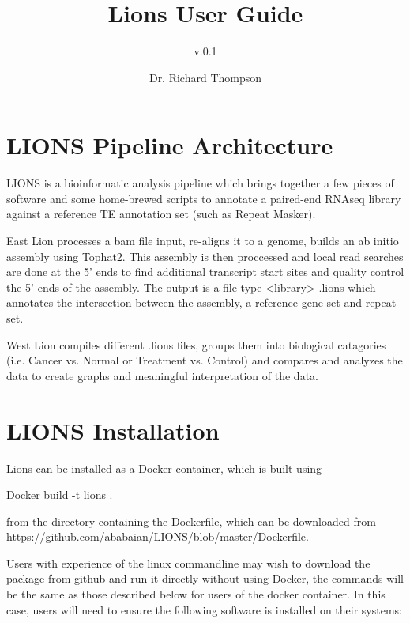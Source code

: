 \documentclass[11pt]{scrartcl}
\title{Lions User Guide}
\subtitle{v.0.1}
\author{Dr. Richard Thompson}
\newcommand{\arrows}[1]{\textless #1\textgreater}
\begin{document}
\maketitle

\tableofcontents


\section{LIONS Pipeline Architecture}
LIONS is a bioinformatic analysis pipeline which brings together a
 few pieces of software and some home-brewed scripts to annotate a
 paired-end RNAseq library against a reference TE annotation set
 (such as Repeat Masker).

 East Lion processes a bam file input, re-aligns it to a genome,
 builds an ab initio assembly using Tophat2. This assembly is then
 proccessed and local read searches are done at the 5' ends to find
 additional transcript start sites and quality control the 5' ends of
 the assembly. The output is a file-type \arrows{library} .lions which
 annotates the intersection between the assembly, a reference gene set
 and repeat set.

 West Lion compiles different .lions files, groups them into biological
 catagories (i.e. Cancer vs. Normal or Treatment vs. Control) and
 compares and analyzes the data to create graphs and meaningful
 interpretation of the data.

\section{LIONS Installation}

Lions can be installed as a Docker container, which is built using

\begin{bash}
Docker build -t lions .
\end{bash}

from the directory containing the Dockerfile, which can be downloaded from \url{https://github.com/ababaian/LIONS/blob/master/Dockerfile}.
\vspace{2em}

Users with experience of the linux commandline may wish to download the package from github and run it directly without using Docker, the commands will be the same as those described below for users of the docker container. In this case, users will need to ensure the following software is installed on their systems: 
\end{document}
